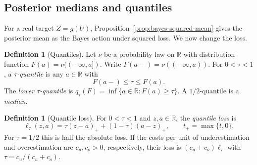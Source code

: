 \documentclass[11pt,oneside]{book}
\theoremstyle{definition}
\newtheorem{definition}[theorem]{Definition}
\theoremstyle{remark}
\newcommand{\R}{\mathbb R}
\begin{document}
\subsection{Posterior medians and quantiles}
\label{subsec:bayesian-posterior-quantiles}

For a real target $Z=g(U)$, Proposition~\ref{prop:bayes-squared-mean}
gives the posterior mean as the Bayes action under squared loss.
We now change the loss.

\begin{definition}[Quantiles]
\label{def:bayesian-real-quantiles}
Let $\nu$ be a probability law on $\R$ with distribution function
$F(a)=\nu((-\infty,a])$. Write $F(a-)=\nu((-\infty,a))$.
For $0<\tau<1$, a \emph{$\tau$-quantile} is any $a\in\R$ with
\[
F(a-)\leq \tau\leq F(a).
\]
The \emph{lower $\tau$-quantile} is
$q_\tau(F)=\inf\{a\in\R:F(a)\geq\tau\}$. A $1/2$-quantile
is a \emph{median}.
\end{definition}

\begin{definition}[Quantile loss]
\label{def:bayesian-quantile-loss}
For $0<\tau<1$ and $z,a\in\R$, the \emph{quantile loss} is
\[
\ell_\tau(z,a)=\tau(z-a)_+ +(1-\tau)(a-z)_+,
\qquad t_+=\max\{t,0\}.
\]
For $\tau=1/2$ this is half the absolute loss. If the costs per
unit of underestimation and overestimation are $c_u,c_o>0$,
respectively, their loss is $(c_u+c_o)\ell_\tau$ with
$\tau=c_u/(c_u+c_o)$.
\end{definition}
\end{document}

